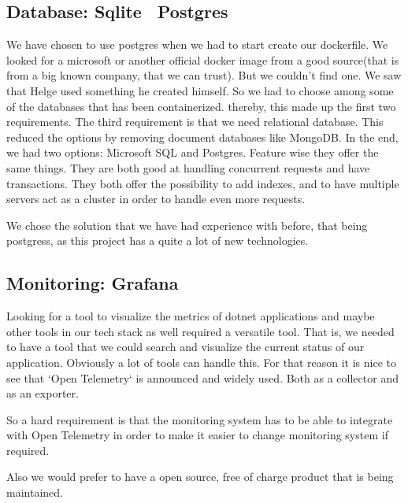 \subsection{Database: Sqlite \rightarrow Postgres} %

We have chosen to use postgres when we had to start create our dockerfile. We looked for a microsoft or another official docker image from a good source(that is from a big known company, that we can trust). But we couldn’t find one. We saw that Helge used something he created himself. So we had to choose among some of the databases that has been containerized. thereby, this made up the first two requirements. The third requirement is that we need relational database. This reduced the options by removing document databases like MongoDB. In the end, we had two options: Microsoft SQL and Postgres.  Feature wise they offer the same things. They are both good at handling concurrent requests and have transactions. They both offer the possibility to add indexes, and to have multiple servers act as a cluster in order to handle even more requests.

We chose the solution that we have had experience with before, that being postgress, as this project has a quite a lot of new technologies.


\subsection{Monitoring: Grafana} %
Looking for a tool to visualize the metrics of dotnet applications and maybe other tools in our tech stack as well required a versatile tool. That is, we needed to have a tool that we could search and visualize the current status of our application. Obviously a lot of tools can handle this. For that reason it is nice to see that `Open Telemetry` is announced and widely used. Both as a collector and as an exporter. 

So a hard requirement is that the monitoring system has to be able to integrate with Open Telemetry in order to make it easier to change monitoring system if required. 

Also we would prefer to have a open source, free of charge product that is being maintained. 

